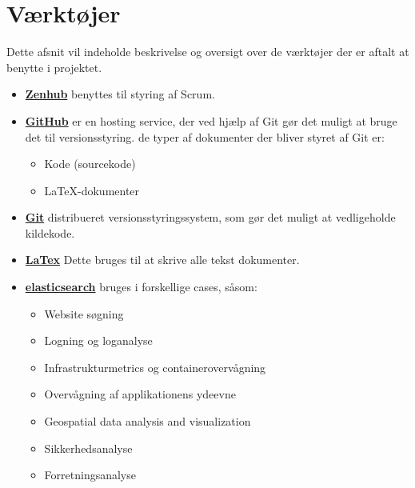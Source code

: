\section{Værktøjer}
Dette afsnit vil indeholde beskrivelse og oversigt over de værktøjer der er aftalt at benytte i projektet.

\begin{itemize}
    \item \underline{\textbf{Zenhub}} benyttes til styring af Scrum.
    \item \underline{\textbf{GitHub}} er en hosting service, der ved hjælp af Git gør det muligt at bruge det til versionsstyring. de typer af dokumenter der bliver styret af Git er:
    \begin{itemize}
		\item Kode (sourcekode)
		\item LaTeX-dokumenter
	\end{itemize} 
    \item \underline{\textbf{ Git}} distribueret versionsstyringssystem, som gør det muligt at vedligeholde kildekode. 
    \item \underline{\textbf{LaTex}} Dette bruges til at skrive alle tekst dokumenter.
    \item \underline{\textbf{elasticsearch}} bruges i forskellige cases, såsom:
    \begin{itemize}
       \item  Website søgning
       \item  Logning og loganalyse
       \item  Infrastrukturmetrics og containerovervågning
       \item  Overvågning af applikationens ydeevne
       \item Geospatial data analysis and visualization
       \item Sikkerhedsanalyse
       \item Forretningsanalyse
    \end{itemize}
   

\end{itemize}
